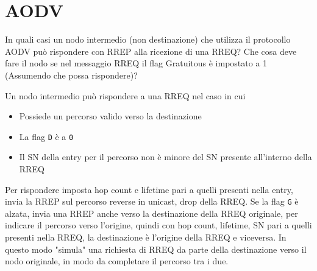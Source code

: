 \section{AODV}

\begin{questions}
    \question In quali casi un nodo intermedio (non destinazione) che utilizza il protocollo AODV può rispondere con RREP alla ricezione di una RREQ? Che cosa deve fare il nodo se nel messaggio RREQ il flag Gratuitous è impostato a 1 (Assumendo che possa rispondere)? 
    
    \begin{solution}
        Un nodo intermedio può rispondere a una RREQ nel caso in cui
        \begin{itemize}
            \item Possiede un percorso valido verso la destinazione
            
            \item La flag \texttt{D} è a \texttt{0}
            
            \item Il SN della entry per il percorso non è minore del SN presente all'interno della RREQ
        \end{itemize}
        
        Per rispondere imposta hop count e lifetime pari a quelli presenti nella entry, invia la RREP sul percorso reverse in unicast, drop della RREQ. Se la flag \texttt{G} è alzata, invia una RREP anche verso la destinazione della RREQ originale, per indicare il percorso verso l'origine, quindi con hop count, lifetime, SN pari a quelli presenti nella RREQ, la destinazione è l'origine della RREQ e viceversa. In questo modo "simula" una richiesta di RREQ da parte della destinazione verso il nodo originale, in modo da completare il percorso tra i due.
    \end{solution}
    

\end{questions}

